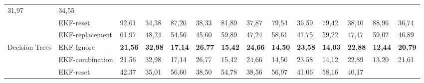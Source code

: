 \documentclass[letterpaper, 10 pt, conference]{ieeeconf}  %
\begin{document}
\begin{table*}[]
\begin{tabular}{@{}llllllllllllll@{}}
		\multicolumn{1}{l|}{31,97} &
		\multicolumn{1}{l|}{34,55} \\ \cmidrule(l){2-14} 
		\multicolumn{1}{|l|}{} &
		\multicolumn{1}{l|}{EKF-reset} &
		\multicolumn{1}{l|}{92,61} &
		\multicolumn{1}{l|}{34,38} &
		\multicolumn{1}{l|}{87,20} &
		\multicolumn{1}{l|}{38,33} &
		\multicolumn{1}{l|}{81,89} &
		\multicolumn{1}{l|}{37,87} &
		\multicolumn{1}{l|}{79,54} &
		\multicolumn{1}{l|}{36,59} &
		\multicolumn{1}{l|}{79,42} &
		\multicolumn{1}{l|}{38,40} &
		\multicolumn{1}{l|}{88,96} &
		\multicolumn{1}{l|}{36,74} \\ \cmidrule(l){2-14} 
		\multicolumn{1}{|l|}{} &
		\multicolumn{1}{l|}{EKF-replacement} &
		\multicolumn{1}{l|}{61,97} &
		\multicolumn{1}{l|}{48,24} &
		\multicolumn{1}{l|}{54,56} &
		\multicolumn{1}{l|}{45,60} &
		\multicolumn{1}{l|}{59,89} &
		\multicolumn{1}{l|}{47,24} &
		\multicolumn{1}{l|}{58,61} &
		\multicolumn{1}{l|}{47,75} &
		\multicolumn{1}{l|}{59,22} &
		\multicolumn{1}{l|}{47,47} &
		\multicolumn{1}{l|}{59,02} &
		\multicolumn{1}{l|}{46,89} \\ \midrule
		\multicolumn{1}{|l|}{\multirow{4}{*}{Decision Trees}} &
		\multicolumn{1}{l|}{EKF-Ignore} &
		\multicolumn{1}{l|}{\textbf{21,56}} &
		\multicolumn{1}{l|}{\textbf{32,98}} &
		\multicolumn{1}{l|}{\textbf{17,14}} &
		\multicolumn{1}{l|}{\textbf{26,77}} &
		\multicolumn{1}{l|}{\textbf{15,42}} &
		\multicolumn{1}{l|}{\textbf{24,66}} &
		\multicolumn{1}{l|}{\textbf{14,50}} &
		\multicolumn{1}{l|}{\textbf{23,58}} &
		\multicolumn{1}{l|}{\textbf{14,03}} &
		\multicolumn{1}{l|}{\textbf{22,88}} &
		\multicolumn{1}{l|}{\textbf{12,44}} &
		\multicolumn{1}{l|}{\textbf{20,79}} \\ \cmidrule(l){2-14} 
		\multicolumn{1}{|l|}{} &
		\multicolumn{1}{l|}{EKF-combination} &
		\multicolumn{1}{l|}{21,56} &
		\multicolumn{1}{l|}{32,98} &
		\multicolumn{1}{l|}{17,14} &
		\multicolumn{1}{l|}{26,77} &
		\multicolumn{1}{l|}{15,42} &
		\multicolumn{1}{l|}{24,66} &
		\multicolumn{1}{l|}{14,50} &
		\multicolumn{1}{l|}{23,58} &
		\multicolumn{1}{l|}{14,12} &
		\multicolumn{1}{l|}{22,89} &
		\multicolumn{1}{l|}{13,20} &
		\multicolumn{1}{l|}{21,61} \\ \cmidrule(l){2-14} 
		\multicolumn{1}{|l|}{} &
		\multicolumn{1}{l|}{EKF-reset} &
		\multicolumn{1}{l|}{42,37} &
		\multicolumn{1}{l|}{35,01} &
		\multicolumn{1}{l|}{56,60} &
		\multicolumn{1}{l|}{38,50} &
		\multicolumn{1}{l|}{54,78} &
		\multicolumn{1}{l|}{38,56} &
		\multicolumn{1}{l|}{56,97} &
		\multicolumn{1}{l|}{41,06} &
		\multicolumn{1}{l|}{58,16} &
		\multicolumn{1}{l|}{40,17} &

\end{tabular}
\end{table*}
\end{document}
